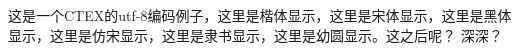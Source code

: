 \documentclass{ctexbook}
\begin{document}
这是一个CTEX的utf-8编码例子，{\kaishu 这里是楷体显示}，{\songti 这里是宋体显示}，{\heiti 这里是黑体显示}，{\fangsong 这里是仿宋显示}，{\lishu 这里是隶书显示}，{\youyuan 这里是幼圆显示}。这之后呢？ 深深？
\end{document}
